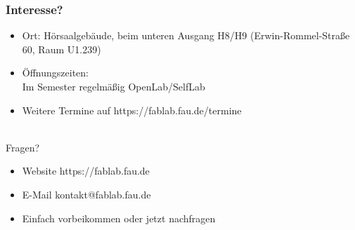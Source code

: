 \documentclass[t]{beamer}
\begin{document}
\begin{frame}
    \frametitle{Interesse?}

    \begin{itemize}
        \item Ort: Hörsaalgebäude, beim unteren Ausgang H8/H9 (Erwin-Rommel-Straße 60, Raum U1.239)
        \item Öffnungszeiten: \\Im Semester regelmäßig OpenLab/SelfLab
        \item Weitere Termine auf {\color{blue} https://fablab.fau.de/termine}
    \end{itemize}
    ~\\
    Fragen?
    \begin{itemize}
        \item Website {\color{blue} https://fablab.fau.de}
        \item E-Mail {\color{blue} kontakt@fablab.fau.de}
        \item Einfach vorbeikommen oder jetzt nachfragen
    \end{itemize}
\end{frame}
\end{document}
